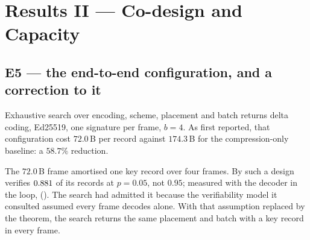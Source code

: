 \chapter{Results II --- Co-design and Capacity}\label{ch:codesign}

\section{E5 --- the end-to-end configuration, and a correction to it}

Exhaustive search over encoding, scheme, placement and batch returns delta coding, Ed25519, one
signature per frame, $b = 4$. As first reported, that configuration cost $72.0$\,B per record
against $174.3$\,B for the compression-only baseline: a $58.7\%$ reduction.

\begin{remark}
The $72.0$\,B frame amortised one key record over four frames. By  such a design
verifies $0.881$ of its records at $p = 0.05$, not $0.95$; measured with the decoder in the
loop, \lossVFour{} (). The search had admitted it because the verifiability model it
consulted assumed every frame decodes alone. With that assumption replaced by the theorem, the
search returns the same placement and batch with a key record in every frame.
\end{remark}

